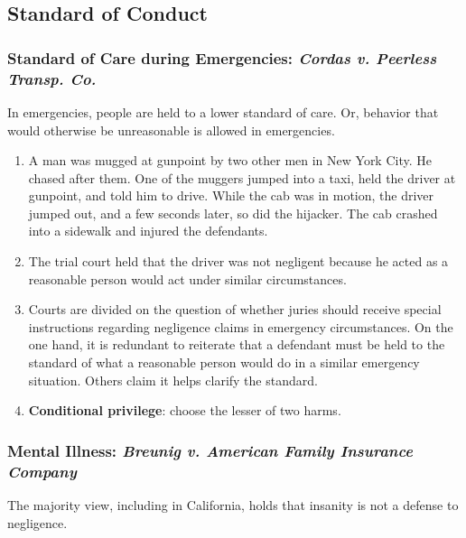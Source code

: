 \subsection{Standard of Conduct}

\subsubsection{Standard of Care during Emergencies: \emph{Cordas v. Peerless 
Transp. Co.}}

In emergencies, people are held to a lower standard of care. Or, behavior that 
would otherwise be unreasonable is allowed in emergencies.

\begin{enumerate}
    \item A man was mugged at gunpoint by two other men in New York City. He 
    chased after them. One of the muggers jumped into a taxi, held the driver 
    at gunpoint, and told him to drive. While the cab was in motion, the 
    driver jumped out, and a few seconds later, so did the hijacker. The cab 
    crashed into a sidewalk and injured the defendants.
    \item The trial court held that the driver was not negligent because he 
    acted as a reasonable person would act under similar circumstances.
    \item Courts are divided on the question of whether juries should receive 
    special instructions regarding negligence claims in emergency 
    circumstances. On the one hand, it is redundant to reiterate that a 
    defendant must be held to the standard of what a reasonable person would 
    do in a similar emergency situation. Others claim it helps clarify the 
    standard.
    \item \textbf{Conditional privilege}: choose the lesser of two harms.
\end{enumerate}

\subsubsection{Mental Illness: \emph{Breunig v. American Family Insurance Company}}

The majority view, including in California, holds that insanity is not a 
defense to negligence.

